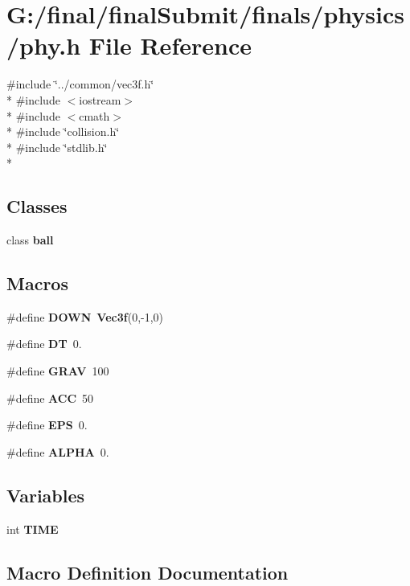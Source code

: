 \section{G\-:/final/final\-Submit/finals/physics/phy.h File Reference}
\label{phy_8h}
{\ttfamily \#include \char`\"{}../common/vec3f.\-h\char`\"{}}\\*
{\ttfamily \#include $<$iostream$>$}\\*
{\ttfamily \#include $<$cmath$>$}\\*
{\ttfamily \#include \char`\"{}collision.\-h\char`\"{}}\\*
{\ttfamily \#include \char`\"{}stdlib.\-h\char`\"{}}\\*
\subsection*{Classes}
\begin{DoxyCompactItemize}
\item 
class {\bf ball}
\end{DoxyCompactItemize}
\subsection*{Macros}
\begin{DoxyCompactItemize}
\item 
\#define {\bf D\-O\-W\-N}~{\bf Vec3f}(0,-\/1,0)
\item 
\#define {\bf D\-T}~0.
\item 
\#define {\bf G\-R\-A\-V}~100
\item 
\#define {\bf A\-C\-C}~50
\item 
\#define {\bf E\-P\-S}~0.
\item 
\#define {\bf A\-L\-P\-H\-A}~0.
\end{DoxyCompactItemize}
\subsection*{Variables}
\begin{DoxyCompactItemize}
\item 
int {\bf T\-I\-M\-E}
\end{DoxyCompactItemize}


\subsection{Macro Definition Documentation}
